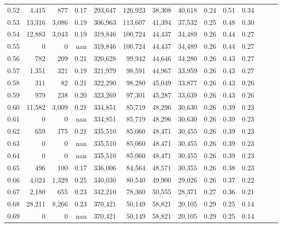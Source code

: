 \begin{tabular}{rrrrrrrrrrrrrr}
0.52 &   4,415 &    877 &  0.17 &  293,647 &  126,923 &  38,308 &  40,618 &  0.24 &  0.51 &      0.34 \\
0.53 &  13,316 &  3,086 &  0.19 &  306,963 &  113,607 &  41,394 &  37,532 &  0.25 &  0.48 &      0.30 \\
0.54 &  12,883 &  3,043 &  0.19 &  319,846 &  100,724 &  44,437 &  34,489 &  0.26 &  0.44 &      0.27 \\
0.55 &       0 &      0 &   nan &  319,846 &  100,724 &  44,437 &  34,489 &  0.26 &  0.44 &      0.27 \\
0.56 &     782 &    209 &  0.21 &  320,628 &   99,942 &  44,646 &  34,280 &  0.26 &  0.43 &      0.27 \\
0.57 &   1,351 &    321 &  0.19 &  321,979 &   98,591 &  44,967 &  33,959 &  0.26 &  0.43 &      0.27 \\
0.58 &     311 &     82 &  0.21 &  322,290 &   98,280 &  45,049 &  33,877 &  0.26 &  0.43 &      0.26 \\
0.59 &     979 &    238 &  0.20 &  323,269 &   97,301 &  45,287 &  33,639 &  0.26 &  0.43 &      0.26 \\
0.60 &  11,582 &  3,009 &  0.21 &  334,851 &   85,719 &  48,296 &  30,630 &  0.26 &  0.39 &      0.23 \\
0.61 &       0 &      0 &   nan &  334,851 &   85,719 &  48,296 &  30,630 &  0.26 &  0.39 &      0.23 \\
0.62 &     659 &    175 &  0.21 &  335,510 &   85,060 &  48,471 &  30,455 &  0.26 &  0.39 &      0.23 \\
0.63 &       0 &      0 &   nan &  335,510 &   85,060 &  48,471 &  30,455 &  0.26 &  0.39 &      0.23 \\
0.64 &       0 &      0 &   nan &  335,510 &   85,060 &  48,471 &  30,455 &  0.26 &  0.39 &      0.23 \\
0.65 &     496 &    100 &  0.17 &  336,006 &   84,564 &  48,571 &  30,355 &  0.26 &  0.38 &      0.23 \\
0.66 &   4,024 &  1,329 &  0.25 &  340,030 &   80,540 &  49,900 &  29,026 &  0.26 &  0.37 &      0.22 \\
0.67 &   2,180 &    655 &  0.23 &  342,210 &   78,360 &  50,555 &  28,371 &  0.27 &  0.36 &      0.21 \\
0.68 &  28,211 &  8,266 &  0.23 &  370,421 &   50,149 &  58,821 &  20,105 &  0.29 &  0.25 &      0.14 \\
0.69 &       0 &      0 &   nan &  370,421 &   50,149 &  58,821 &  20,105 &  0.29 &  0.25 &      0.14 \\

\end{tabular}

